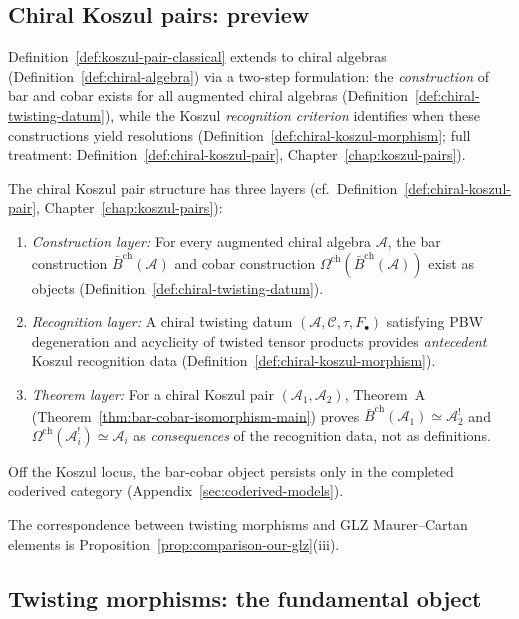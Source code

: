 \subsection{Chiral Koszul pairs: preview}
\label{subsec:chiral-koszul-pairs-precise}

Definition~\ref{def:koszul-pair-classical} extends to chiral algebras (Definition~\ref{def:chiral-algebra}) via a two-step formulation: the \emph{construction} of bar and cobar exists for all augmented chiral algebras (Definition~\ref{def:chiral-twisting-datum}), while the Koszul \emph{recognition criterion} identifies when these constructions yield resolutions (Definition~\ref{def:chiral-koszul-morphism}; full treatment: Definition~\ref{def:chiral-koszul-pair}, Chapter~\ref{chap:koszul-pairs}).

The chiral Koszul pair structure has three layers
(cf.\ Definition~\ref{def:chiral-koszul-pair},
Chapter~\ref{chap:koszul-pairs}):
\begin{enumerate}[label=\textup{(\roman*)}]
\item \emph{Construction layer:} For every augmented chiral algebra
  $\mathcal{A}$, the bar construction
  $\bar{B}^{\mathrm{ch}}(\mathcal{A})$ and cobar construction
  $\Omega^{\mathrm{ch}}(\bar{B}^{\mathrm{ch}}(\mathcal{A}))$ exist as
  objects (Definition~\ref{def:chiral-twisting-datum}).

\item \emph{Recognition layer:} A chiral twisting datum
  $(\mathcal{A}, \mathcal{C}, \tau, F_\bullet)$ satisfying PBW
  degeneration and acyclicity of twisted tensor products
  provides \emph{antecedent} Koszul recognition data
  (Definition~\ref{def:chiral-koszul-morphism}).

\item \emph{Theorem layer:} For a chiral Koszul pair
  $(\mathcal{A}_1, \mathcal{A}_2)$, Theorem~A
  (Theorem~\ref{thm:bar-cobar-isomorphism-main}) proves
  $\bar{B}^{\mathrm{ch}}(\mathcal{A}_1) \simeq \mathcal{A}_2^!$
  and $\Omega^{\mathrm{ch}}(\mathcal{A}_i^!) \simeq \mathcal{A}_i$
  as \emph{consequences} of the recognition data, not as definitions.
\end{enumerate}
Off the Koszul locus, the bar-cobar object persists only in
the completed coderived category
(Appendix~\ref{sec:coderived-models}).%

The correspondence between twisting morphisms and GLZ Maurer--Cartan
elements is Proposition~\ref{prop:comparison-our-glz}(iii).%

\subsection{Twisting morphisms: the fundamental object}
\label{subsec:twisting-morphisms-fundamental}


